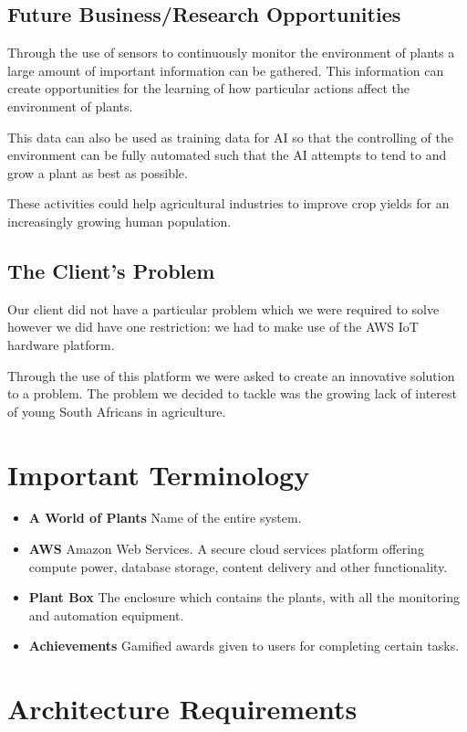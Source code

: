 \documentclass{article}
\begin{document}
\subsection{Future Business/Research Opportunities}
	Through the use of sensors to continuously monitor the environment of plants a large amount of important information can be gathered. This information can create opportunities for the learning of how particular actions affect the environment of plants.
	
	This data can also be used as training data for AI so that the controlling of the environment can be fully automated such that the AI attempts to tend to and grow a plant as best as possible.
	
	These activities could help agricultural industries to improve crop yields for an increasingly growing human population.

\subsection{The Client's Problem}
	Our client did not have a particular problem which we were required to solve however we did have one restriction: we had to make use of the AWS IoT hardware platform.
	
	Through the use of this platform we were asked to create an innovative solution to a problem. The problem we decided to tackle was the growing lack of interest of young South Africans in agriculture.
	
\section{Important Terminology}
\begin{itemize}
	\item \textbf{A World of Plants} Name of the entire system.
	\item \textbf{AWS} Amazon Web Services. A secure cloud services platform offering compute power, database storage, content delivery and other functionality.
	\item \textbf{Plant Box} The enclosure which contains the plants, with all the monitoring and automation equipment.
	\item \textbf{Achievements} Gamified awards given to users for completing certain tasks.
\end{itemize}

\section{Architecture Requirements}
\end{document}
